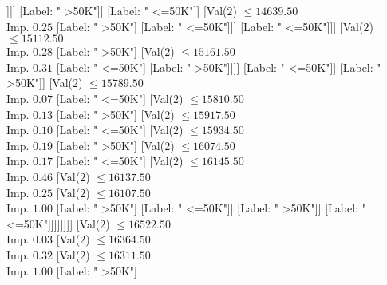 \documentclass[margin=10pt]{standalone}
\begin{document}
\begin{forest}
																											[Val($2$) $ \leq 14100.50$ \\ Imp. $0.17$
																												[Label: " <=50K"]
																												[Val($2$) $ \leq 14239.50$ \\ Imp. $0.25$
																													[Label: " >50K"]
																													[Label: " <=50K"]]]]
																										[Label: " >50K"]]
																									[Label: " <=50K"]]
																								[Val($2$) $ \leq 14639.50$ \\ Imp. $0.25$
																									[Label: " >50K"]
																									[Label: " <=50K"]]]
																							[Label: " <=50K"]]]
																					[Val($2$) $ \leq 15112.50$ \\ Imp. $0.28$
																						[Label: " >50K"]
																						[Val($2$) $ \leq 15161.50$ \\ Imp. $0.31$
																							[Label: " <=50K"]
																							[Label: " >50K"]]]]
																				[Label: " <=50K"]]
																			[Label: " >50K"]]
																		[Val($2$) $ \leq 15789.50$ \\ Imp. $0.07$
																			[Label: " <=50K"]
																			[Val($2$) $ \leq 15810.50$ \\ Imp. $0.13$
																				[Label: " >50K"]
																				[Val($2$) $ \leq 15917.50$ \\ Imp. $0.10$
																					[Label: " <=50K"]
																					[Val($2$) $ \leq 15934.50$ \\ Imp. $0.19$
																						[Label: " >50K"]
																						[Val($2$) $ \leq 16074.50$ \\ Imp. $0.17$
																							[Label: " <=50K"]
																							[Val($2$) $ \leq 16145.50$ \\ Imp. $0.46$
																								[Val($2$) $ \leq 16137.50$ \\ Imp. $0.25$
																									[Val($2$) $ \leq 16107.50$ \\ Imp. $1.00$
																										[Label: " >50K"]
																										[Label: " <=50K"]]
																									[Label: " >50K"]]
																								[Label: " <=50K"]]]]]]]]
																	[Val($2$) $ \leq 16522.50$ \\ Imp. $0.03$
																		[Val($2$) $ \leq 16364.50$ \\ Imp. $0.32$
																			[Val($2$) $ \leq 16311.50$ \\ Imp. $1.00$
																				[Label: " >50K"]

\end{forest}
\end{document}
